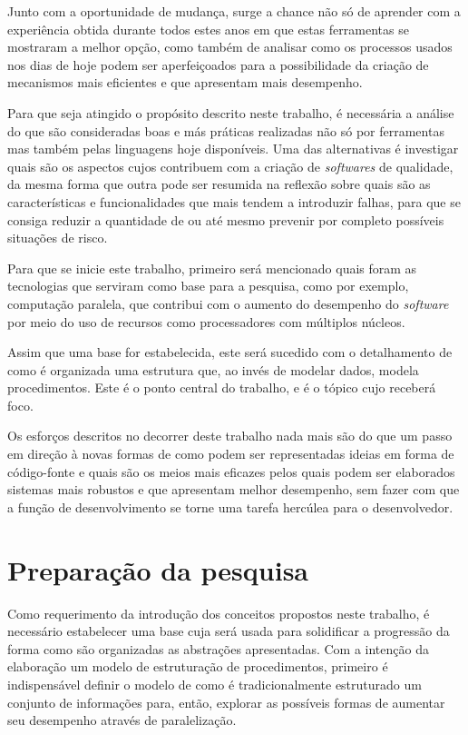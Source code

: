 \documentclass[12pt]{article}
\begin{document}
  Junto com a oportunidade de mudança, surge a chance não só de aprender com a experiência obtida durante todos estes anos em que estas ferramentas se mostraram a melhor opção, como também de analisar como os processos usados nos dias de hoje podem ser aperfeiçoados para a possibilidade da criação de mecanismos mais eficientes e que apresentam mais desempenho.
  
  Para que seja atingido o propósito descrito neste trabalho, é necessária a análise do que são consideradas boas e más práticas realizadas não só por ferramentas mas também pelas linguagens hoje disponíveis. Uma das alternativas é investigar quais são os aspectos cujos contribuem com a criação de \textit{softwares} de qualidade, da mesma forma que outra pode ser resumida na reflexão sobre quais são as características e funcionalidades que mais tendem a introduzir falhas, para que se consiga reduzir a quantidade de ou até mesmo prevenir por completo possíveis situações de risco.
  
  Para que se inicie este trabalho, primeiro será mencionado quais foram as tecnologias que serviram como base para a pesquisa, como por exemplo, computação paralela, que contribui com o aumento do desempenho do \textit{software} por meio do uso de recursos como processadores com múltiplos núcleos.
  
  Assim que uma base for estabelecida, este será sucedido com o detalhamento de como é organizada uma estrutura que, ao invés de modelar dados, modela procedimentos. Este é o ponto central do trabalho, e é o tópico cujo receberá foco.
  
  Os esforços descritos no decorrer deste trabalho nada mais são do que um passo em direção à novas formas de como podem ser representadas ideias em forma de código-fonte e quais são os meios mais eficazes pelos quais podem ser elaborados sistemas mais robustos e que apresentam melhor desempenho, sem fazer com que a função de desenvolvimento se torne uma tarefa hercúlea para o desenvolvedor.
  
  \section{Preparação da pesquisa}
  
  Como requerimento da introdução dos conceitos propostos neste trabalho, é necessário estabelecer uma base cuja será usada para solidificar a progressão da forma como são organizadas as abstrações apresentadas. Com a intenção da elaboração um modelo de estruturação de procedimentos, primeiro é indispensável definir o modelo de como é tradicionalmente estruturado um conjunto de informações para, então, explorar as possíveis formas de aumentar seu desempenho através de paralelização.
  
\end{document}
